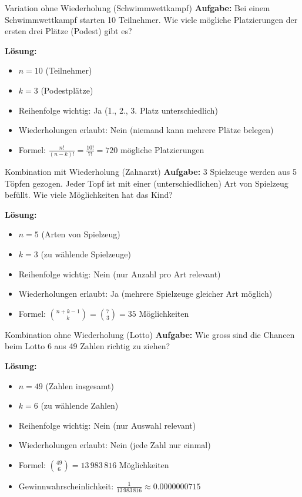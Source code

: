 \begin{example}{Variation ohne Wiederholung (Schwimmwettkampf)}
\textbf{Aufgabe:} Bei einem Schwimmwettkampf starten 10 Teilnehmer. Wie viele mögliche Platzierungen der ersten drei Plätze (Podest) gibt es?

\textbf{Lösung:}
\begin{itemize}
\item $n = 10$ (Teilnehmer)
\item $k = 3$ (Podestplätze)
\item Reihenfolge wichtig: Ja (1., 2., 3. Platz unterschiedlich)
\item Wiederholungen erlaubt: Nein (niemand kann mehrere Plätze belegen)
\item Formel: $\frac{n!}{(n-k)!} = \frac{10!}{7!} = 720$ mögliche Platzierungen
\end{itemize}
\end{example}

\begin{example}{Kombination mit Wiederholung (Zahnarzt)}
\textbf{Aufgabe:} 3 Spielzeuge werden aus 5 Töpfen gezogen. Jeder Topf ist mit einer (unterschiedlichen) Art von Spielzeug befüllt. Wie viele Möglichkeiten hat das Kind?

\textbf{Lösung:}
\begin{itemize}
\item $n = 5$ (Arten von Spielzeug)
\item $k = 3$ (zu wählende Spielzeuge)
\item Reihenfolge wichtig: Nein (nur Anzahl pro Art relevant)
\item Wiederholungen erlaubt: Ja (mehrere Spielzeuge gleicher Art möglich)
\item Formel: $\binom{n+k-1}{k} = \binom{7}{3} = 35$ Möglichkeiten
\end{itemize}
\end{example}

\begin{example}{Kombination ohne Wiederholung (Lotto)}
\textbf{Aufgabe:} Wie gross sind die Chancen beim Lotto 6 aus 49 Zahlen richtig zu ziehen?

\textbf{Lösung:}
\begin{itemize}
\item $n = 49$ (Zahlen insgesamt)
\item $k = 6$ (zu wählende Zahlen)
\item Reihenfolge wichtig: Nein (nur Auswahl relevant)
\item Wiederholungen erlaubt: Nein (jede Zahl nur einmal)
\item Formel: $\binom{49}{6} = 13\,983\,816$ Möglichkeiten
\item Gewinnwahrscheinlichkeit: $\frac{1}{13\,983\,816} \approx 0.0000000715$
\end{itemize}
\end{example}

